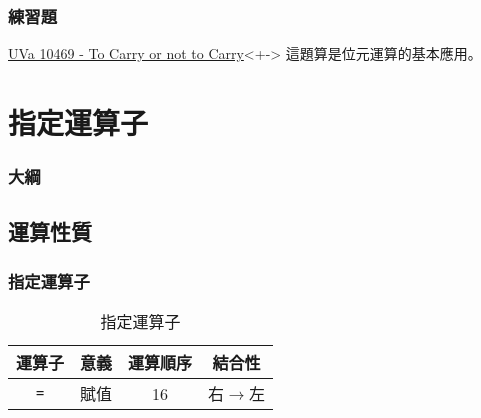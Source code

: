 \documentclass[utf8]{beamer}
\begin{document}
\begin{CJK}{UTF8}{bkai}
\begin{frame}
  \frametitle{練習題}
  \begin{exampleblock}{\href{http://unfortunate-dog.github.io/articles/104/p10469/}{UVa 10469 - To Carry or not to Carry}}<+->
  \label{uva:10469}
  這題算是位元運算的基本應用。
  \end{exampleblock}
\end{frame}

\section{指定運算子}
\begin{frame}
  \frametitle{大綱}
  \begin{multicols}{2}
    \tableofcontents[currentsection]
  \end{multicols}
\end{frame}

\subsection{運算性質}

\begin{frame}[fragile]
  \frametitle{指定運算子}
  \begin{table}[h]
    \begin{tabular}{|c|c|c|c|}
    \hline
    運算子           & 意義 & 運算順序 & 結合性\\
    \hline
    \lstinline{=}{} & 賦值 & 16     & \alert{右$\rightarrow$左}\\
    \hline
    \end{tabular}
    \caption{指定運算子}
  \end{table}
\end{frame}


\end{CJK}
\end{document}
